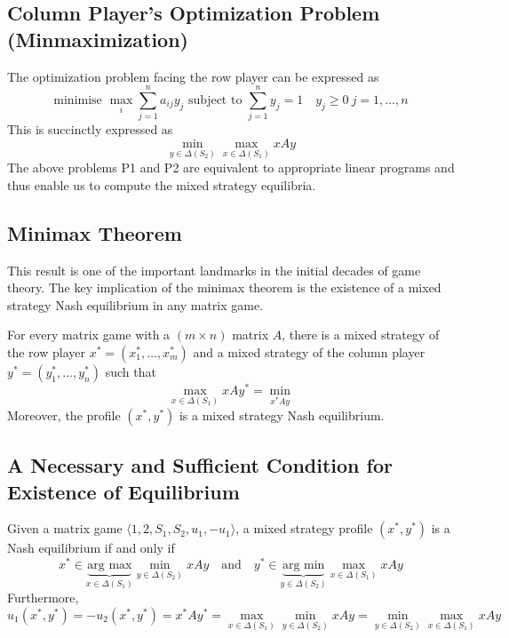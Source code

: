\subsection{Column Player’s Optimization Problem (Minmaximization)}
The optimization problem facing the row player can be expressed as
\[\text{minimise }\max_{i}\sum_{j=1}^n a_{ij}y_j\text{ subject to }\sum_{j=1}^n y_j=1\quad y_j\geq0\ j=1,\ldots,n\]
This is succinctly expressed as
\[\min_{y\in\Delta(S_2)}\max_{x\in \Delta(S_1)}xAy\]
The above problems P1 and P2 are equivalent to appropriate linear programs and thus enable us to compute the mixed strategy equilibria.
\subsection{Minimax Theorem}
This result is one of the important landmarks in the initial decades of game theory.
The key implication of the minimax theorem is the existence of a mixed strategy Nash equilibrium in any matrix game.
\begin{theorem}
	For every matrix game with a $(m\times n)$ matrix $A$, there is a mixed strategy of the row player $x^*=(x_1^*,\ldots,x_m^*)$ and a mixed strategy of the column player $y^*=(y_1^*,\ldots,y_n^*)$ such that
	\[\max_{x\in\Delta(S_1)}xAy^*=\min_{x^*Ay}\]
	Moreover, the profile $(x^*, y^*)$ is a mixed strategy Nash equilibrium.
\end{theorem}
\subsection{A Necessary and Sufficient Condition for Existence of Equilibrium}
\begin{theorem}
	Given a matrix game $\langle {1, 2}, S_1, S_2, u_1, -u_1\rangle$, a mixed strategy profile $(x^*, y^*)$ is a Nash equilibrium if and only if
	\[x^*\in \underbrace{\text{arg max}}_{x\in\Delta(S_1)}\min_{y\in\Delta(S_2)}xAy\quad\text{and}\quad y^*\in \underbrace{\text{arg min}}_{y\in\Delta(S_2)}\max_{x\in\Delta(S_1)}xAy\]
	Furthermore,
	\[u_1(x^*,y^*)=-u_2(x^*,y^*)=x^*Ay^*=\max_{x\in\Delta(S_1)}\min_{y\in\Delta(S_2)}xAy=\min_{y\in\Delta(S_2)}\max_{x\in\Delta(S_1)}xAy\]
\end{theorem}